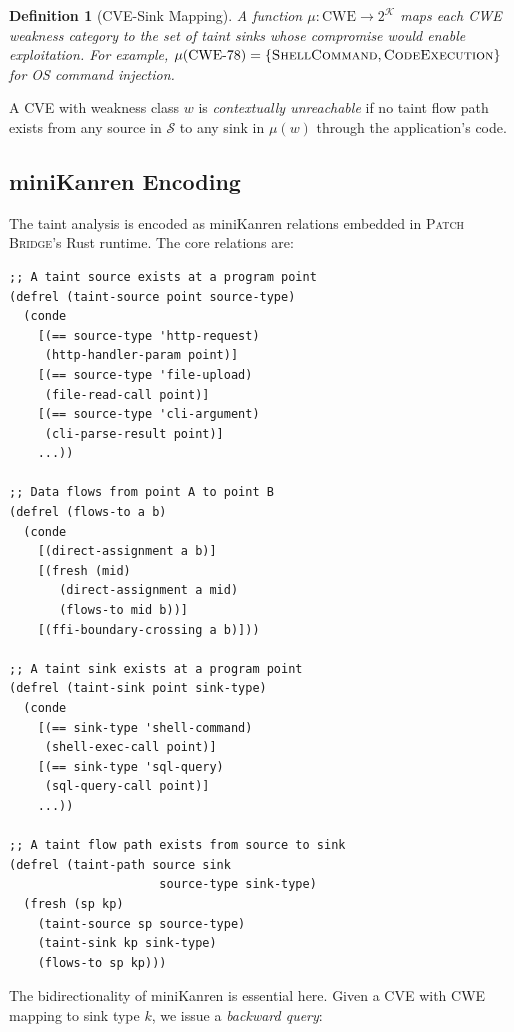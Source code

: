 \documentclass[11pt,twocolumn]{article}
\newtheorem{definition}[theorem]{Definition}
\begin{document}
\begin{definition}[CVE-Sink Mapping]
A function $\mu : \text{CWE} \to 2^{\mathcal{K}}$ maps each CWE
weakness category to the set of taint sinks whose compromise would
enable exploitation. For example, $\mu(\text{CWE-78}) =
\{\textsc{ShellCommand}, \textsc{CodeExecution}\}$ for OS command
injection.
\end{definition}

A CVE with weakness class $w$ is \emph{contextually unreachable} if
no taint flow path exists from any source in $\mathcal{S}$ to any sink
in $\mu(w)$ through the application's code.

\subsection{miniKanren Encoding}
\label{sec:kanren-encoding}

The taint analysis is encoded as miniKanren relations embedded in
\textsc{Patch Bridge}'s Rust runtime. The core relations are:

\begin{lstlisting}[language=miniKanren,caption={Core taint relations in miniKanren},label=lst:kanren-taint]
;; A taint source exists at a program point
(defrel (taint-source point source-type)
  (conde
    [(== source-type 'http-request)
     (http-handler-param point)]
    [(== source-type 'file-upload)
     (file-read-call point)]
    [(== source-type 'cli-argument)
     (cli-parse-result point)]
    ...))

;; Data flows from point A to point B
(defrel (flows-to a b)
  (conde
    [(direct-assignment a b)]
    [(fresh (mid)
       (direct-assignment a mid)
       (flows-to mid b))]
    [(ffi-boundary-crossing a b)]))

;; A taint sink exists at a program point
(defrel (taint-sink point sink-type)
  (conde
    [(== sink-type 'shell-command)
     (shell-exec-call point)]
    [(== sink-type 'sql-query)
     (sql-query-call point)]
    ...))

;; A taint flow path exists from source to sink
(defrel (taint-path source sink
                     source-type sink-type)
  (fresh (sp kp)
    (taint-source sp source-type)
    (taint-sink kp sink-type)
    (flows-to sp kp)))
\end{lstlisting}

The bidirectionality of miniKanren is essential here. Given a CVE
with CWE mapping to sink type $k$, we issue a \emph{backward query}:
\end{document}
